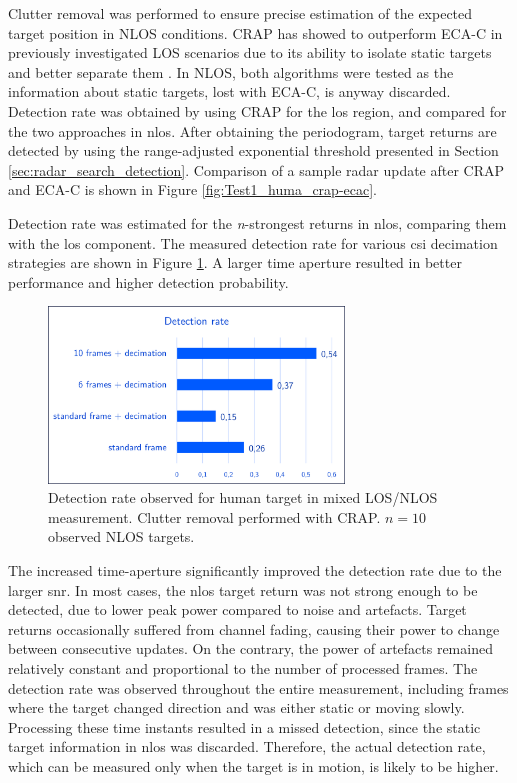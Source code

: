 Clutter removal was performed to ensure precise estimation of the expected target position in NLOS conditions. 
CRAP has showed to outperform ECA-C in previously investigated LOS scenarios due to its ability to isolate static targets and better separate them \cite{Henninger_CRAP_2023}.
In NLOS, both algorithms were tested as the information about static targets, lost with ECA-C, is anyway discarded.
Detection rate was obtained by using CRAP for the \gls{los} region, and compared for the two approaches in \gls{nlos}.
After obtaining the periodogram, target returns are detected by using the range-adjusted exponential threshold presented in Section \ref{sec:radar_search_detection}.
Comparison of a sample radar update after CRAP and ECA-C is shown in Figure \ref{fig:Test1_huma_crap-ecac}.






Detection rate was estimated for the \textit{n}-strongest returns in \gls{nlos}, comparing them with the \gls{los} component.
The measured detection rate for various \gls{csi} decimation strategies are shown in Figure \ref{fig:Test1_detect_hist}. A larger time aperture resulted in better performance and higher detection probability.

\begin{figure}[H]
	\centering
	\includegraphics[width=0.7\textwidth]{Images/Test1/detect_hist/detect_hist_human_LMsans.png}
	\caption{\small Detection rate observed for human target in mixed LOS/NLOS measurement. Clutter removal performed with CRAP. $n=10$ observed NLOS targets.}
	\label{fig:Test1_detect_hist}
\end{figure}

The increased time-aperture significantly improved the detection rate due to the larger \gls{snr}.
In most cases, the \gls{nlos} target return was not strong enough to be detected, due to lower peak power compared to noise and artefacts.
Target returns occasionally suffered from channel fading, causing their power to change between consecutive updates. On the contrary, the power of artefacts remained relatively constant and proportional to the number of processed frames.
The detection rate was observed throughout the entire measurement, including frames where the target changed direction and was either static or moving slowly. Processing these time instants resulted in a missed detection, since the static target information in \gls{nlos} was discarded. 
Therefore, the actual detection rate, which can be measured only when the target is in motion, is likely to be higher.

